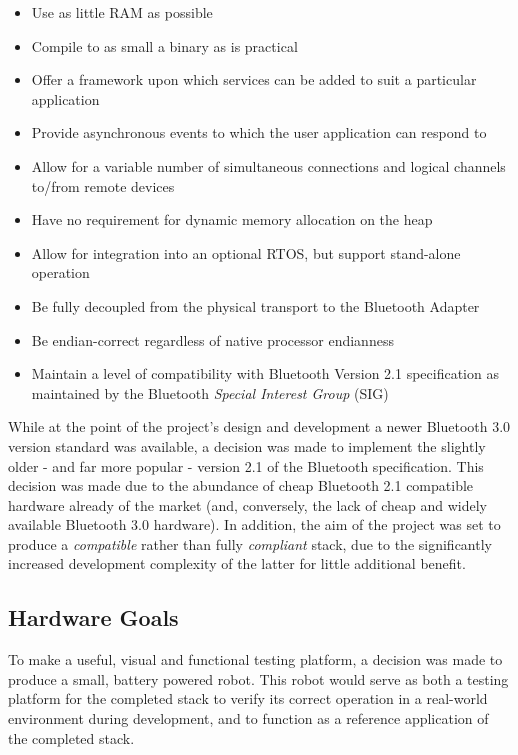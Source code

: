 \begin{itemize}
	\item Use as little RAM as possible
	\item Compile to as small a binary as is practical
	\item Offer a framework upon which services can be added to suit a particular application
	\item Provide asynchronous events to which the user application can respond to
	\item Allow for a variable number of simultaneous connections and logical channels to/from remote devices
	\item Have no requirement for dynamic memory allocation on the heap
	\item Allow for integration into an optional RTOS, but support stand-alone operation
	\item Be fully decoupled from the physical transport to the Bluetooth Adapter
	\item Be endian-correct regardless of native processor endianness
	\item Maintain a level of compatibility with Bluetooth Version 2.1 specification as maintained by the Bluetooth \textit{Special Interest Group} (SIG)
\end{itemize}

While at the point of the project's design and development a newer Bluetooth 3.0 version standard was available, a decision was made to implement the slightly older - and far more popular - version 2.1 of the Bluetooth specification. This decision was made due to the abundance of cheap Bluetooth 2.1 compatible hardware already of the market (and, conversely, the lack of cheap and widely available Bluetooth 3.0 hardware). In addition, the aim of the project was set to produce a \textit{compatible} rather than fully \textit{compliant} stack, due to the significantly increased development complexity of the latter for little additional benefit.

\subsection{Hardware Goals}

To make a useful, visual and functional testing platform, a decision was made to produce a small, battery powered robot. This robot would serve as both a testing platform for the completed stack to verify its correct operation in a real-world environment during development, and to function as a reference application of the completed stack.

